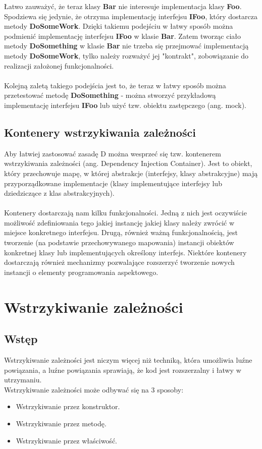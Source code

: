 \documentclass[12pt]{article}
\begin{document}
Łatwo zauważyć, że teraz klasy \textbf{Bar} nie interesuje implementacja klasy \textbf{Foo}. Spodziewa się jedynie, że otrzyma implementację interfejsu \textbf{IFoo}, który dostarcza metody \textbf{DoSomeWork}. Dzięki takiemu podejściu w łatwy sposób można podmienić implementację interfejsu \textbf{IFoo} w klasie \textbf{Bar}. Zatem tworząc ciało metody \textbf{DoSomething} w klasie \textbf{Bar} nie trzeba się przejmować implementacją metody \textbf{DoSomeWork}, tylko należy rozważyć jej "kontrakt", zobowiązanie do realizacji założonej funkcjonalności.\\
\\
Kolejną zaletą takiego podejścia jest to, że teraz w łatwy sposób można przetestować metodę \textbf{DoSomething} - można stworzyć przykładową implementację interfejsu \textbf{IFoo} lub użyć tzw. obiektu zastępczego (ang. mock).


\subsection{Kontenery wstrzykiwania zależności}
Aby łatwiej zastosować zasadę D można wesprzeć się tzw. kontenerem wstrzykiwania zależności (ang. Dependency Injection Container). Jest to obiekt, który przechowuje mapę, w której abstrakcje (interfejsy, klasy abstrakcyjne) mają przyporządkowane implementacje (klasy implementujące interfejsy lub dziedziczące z klas abstrakcyjnych).\\
\\
Kontenery dostarczają nam kilku funkcjonalności. Jedną z nich jest oczywiście możliwość zdefiniowania tego jakiej instancję jakiej klasy należy zwrócić w miejsce konkretnego interfejsu. Drugą, również ważną funkcjonalnością, jest tworzenie (na podstawie przechowywanego mapowania) instancji obiektów konkretnej klasy lub implementujących określony interfejs. Niektóre kontenery dostarczają również mechanizmy pozwalające rozszerzyć tworzenie nowych instancji o elementy programowania aspektowego.



\clearpage
\section{Wstrzykiwanie zależności}
\subsection{Wstęp}
Wstrzykiwanie zależności jest niczym więcej niż techniką, która umożliwia luźne powiązania, a luźne powiązania sprawiają, że kod jest rozszerzalny i łatwy w utrzymaniu.\cite{dependency_injection}\\
Wstrzykiwanie zależności może odbywać się na 3 sposoby:
\begin{itemize}
	\item Wstrzykiwanie przez konstruktor.
	\item Wstrzykiwanie przez metodę.
	\item Wstrzykiwanie przez właściwość.
\end{itemize}
\end{document}
